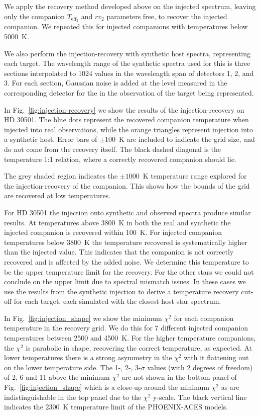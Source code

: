 \documentclass[fleqn,usenatbib]{mnras}
\begin{document}
We apply the recovery method developed above on the injected spectrum, leaving only the companion \(T_{\textrm{eff}_2}\) and \({rv}_2\) parameters free, to recover the injected companion. We repeated this for injected companions with temperatures below 5000~K.

We also perform the injection-recovery with synthetic host spectra, representing each target. The wavelength range of the synthetic spectra used for this is three sections interpolated to 1024 values in the wavelength span of detectors 1, 2, and 3. For each section, Gaussian noise is added at the level measured in the corresponding detector for the in the observation of the target being represented.

In Fig.~\ref{fig:injection-recovery} we show the results of the injection-recovery on {HD 30501}. The blue dots represent the recovered companion temperature when injected into real observations, while the orange triangles represent injection into a synthetic host. Error bars of \(\pm100\)~K are included to indicate the grid size, and do not come from the recovery itself. The black dashed diagonal is the temperature 1:1 relation, where a correctly recovered companion should lie.

The grey shaded region indicates the \(\pm1000\)~K temperature range explored for the injection-recovery of the companion. This shows how the bounds of the grid are recovered at low temperatures.

For {HD 30501} the injection onto synthetic and observed spectra produce similar results. At temperatures above 3800~K in both the real and synthetic the injected companion is recovered within 100~K. For injected companion temperatures below 3800~K the temperature recovered is systematically higher than the injected value. This indicates that the companion is not correctly recovered and is affected by the added noise. We determine this temperature to be the upper temperature limit for the recovery. For the other stars we could not conclude on the upper limit due to spectral mismatch issues. In these cases we use the results from the synthetic injection to derive a temperature recovery cut-off for each target, each simulated with the closest host star spectrum.

In Fig.~\ref{fig:injection_shape} we show the minimum \(\chi^2\) for each companion temperature in the recovery grid. We do this for 7 different injected companion temperatures between 2500 and 4500~K. For the higher temperature companions, the \(\chi^2\) is parabolic in shape, recovering the correct temperature, as expected. At lower temperatures there is a strong asymmetry in the \(\chi^2\) with it flattening out on the lower temperature side.
The 1-, 2-, 3-\(\sigma\) values (with 2 degrees of freedom) of 2, 6 and 11 above the minimum \(\chi^2\) are not shown in the bottom panel of Fig.~\ref{fig:injection_shape} which is a close-up around the minimum \(\chi^2\) as are indistinguishable in the top panel due to the \(\chi^2\) y-scale. The black vertical line indicates the 2300~K temperature limit of the PHOENIX-ACES models.
\end{document}
